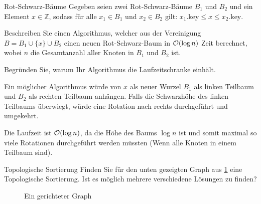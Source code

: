 \documentclass{exercisesheet}
\begin{document}
\begin{eexercises}{Rot-Schwarz-Bäume}{
    Gegeben seien zwei Rot-Schwarz-Bäume $B_1$ und $B_2$ und ein Element $x \in \mathbb{Z}$, sodass für alle $x_1 \in B_1$ und $x_2 \in B_2$ gilt: $x_1.\text{key} \leq x \leq x_2.\text{key}$.
  }
  \item Beschreiben Sie einen Algorithmus, welcher aus der Vereinigung $B = B_1 \cup \{x\} \cup B_2$ einen neuen Rot-Schwarz-Baum in $\mathcal{O}(\log n)$ Zeit berechnet, wobei $n$ die Gesamtanzahl aller Knoten in $B_1$ und $B_2$ ist.
  \item Begründen Sie, warum Ihr Algorithmus die Laufzeitschranke einhält.
\end{eexercises}

\begin{solutions}
  \item Ein möglicher Algorithmus würde von $x$ als neuer Wurzel $B_1$ als linken Teilbaum und $B_2$ als rechten Teilbaum anhängen. Falls die Schwarzhöhe des linken Teilbaums überwiegt, würde eine Rotation nach rechts durchgeführt und umgekehrt.
  \item Die Laufzeit ist $\mathcal{O}(\log n)$, da die Höhe des Baums $\log n$ ist und somit maximal so viele Rotationen durchgeführt werden müssten (Wenn alle Knoten in einem Teilbaum sind).
\end{solutions}



\begin{exercise}{Topologische Sortierung}
  Finden Sie für den unten gezeigten Graph aus \ref{fig:topo} eine Topologische Sortierung. Ist es möglich mehrere verschiedene Lösungen zu finden?
  \begin{figure}[ht]
    \caption{Ein gerichteter Graph}
    \label{fig:topo}
    \centering
  \end{figure}
\end{exercise}
\end{document}

